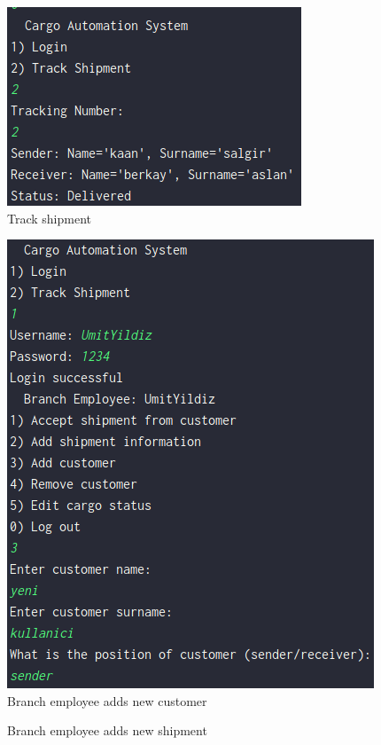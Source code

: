 \documentclass[a4paper]{article}
\begin{document}
\begin{Large}
\begin{center}
\begin{figure}[htp]
\end{figure}
\begin{figure}[htp]
	\caption{Track shipment}
	\includegraphics[scale=0.6]{6-3}
\end{figure}
\begin{figure}[htp]
	\caption{Branch employee adds new customer}
	\includegraphics[scale=0.6]{6-4}
\end{figure}
\begin{figure}[htp]
	\caption{Branch employee adds new shipment}

\end{figure}
\end{center}
\end{Large}
\end{document}
